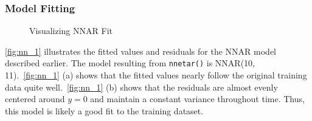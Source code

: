 \documentclass{article}\usepackage[]{graphicx}\usepackage[]{color}
\newenvironment{knitrout}{}{} %
\begin{document}
\subsubsection*{Model Fitting}
\vspace{-20 pt}
\begin{knitrout}
\color{fgcolor}\begin{figure}[H]

{\centering {}

}

\caption[Visualizing NNAR Fit]{Visualizing NNAR Fit}\label{fig:nn_1}
\end{figure}


\end{knitrout}

\autoref{fig:nn_1} illustrates the fitted values and residuals for the NNAR model described earlier. The model resulting from \texttt{nnetar()} is NNAR(10, 11).~\autoref{fig:nn_1} (a) shows that the fitted values nearly follow the original training data quite well.~\autoref{fig:nn_1} (b) shows that the residuals are almost evenly centered around $y=0$ and maintain a constant variance throughout time. Thus, this model is likely a good fit to the training dataset. 
\end{document}
